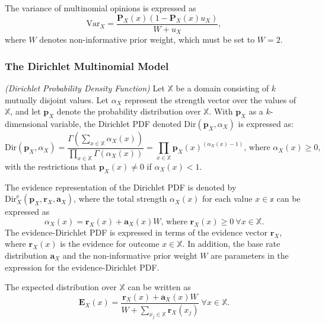 The variance of multinomial opinions is expressed as
\begin{equation}
	\mathrm{Var}_X = \dfrac{\mathbf{P}_X(x)(1 - \mathbf{P}_X(x)u_X)}{W + u_X},
\end{equation}
where $W$ denotes non-informative prior weight, which must be set to $W = 2$.

\subsubsection{The Dirichlet Multinomial Model}

\begin{definition}
	\emph{(Dirichlet Probability Density Function)} Let $\mathbb{X}$ be a domain consisting of $k$ mutually disjoint values. Let $\alpha_X$ represent the strength vector over the
values of $\mathbb{X}$, and let $\mathbf{p}_X$ denote the probability distribution over $\mathbb{X}$. With $\mathbf{p}_X$ as a
$k$-dimensional variable, the Dirichlet PDF denoted $\mathrm{Dir}(\mathbf{p}_X, \alpha_{X})$ is expressed as:
	\begin{equation}
		\mathrm{Dir}(\mathbf{p}_X, \alpha_X) = \dfrac{\Gamma\left(\sum\limits_{x \in \mathbb{X}} \alpha_X(x)\right)}{\prod\limits_{x \in \mathbb{X}} \Gamma(\alpha_X(x))} = \prod\limits_{x \in \mathbb{X}} \mathbf{p}_X(x)^{(\alpha_X(x)-1)} \text{, where } \alpha_X(x) \geq 0\text{,}
	\end{equation}
	with the restrictions that $\mathbf{p}_X(x) \neq 0$ if $\alpha_X(x)	< 1$.
\end{definition}

The evidence representation of the Dirichlet PDF is denoted by $\mathrm{Dir}^{\mathrm{e}}_X(\mathbf{p}_X, \mathbf{r}_X, \mathbf{a}_X)$, where the total strength $\alpha_X(x)$ for each value $x \in \mathbb{x}$ can be expressed as
\begin{equation}
    \alpha_X(x) = \mathbf{r}_X(x) + \mathbf{a}_X(x)W\text{, where }\mathbf{r}_X(x) \geq 0\ \forall x \in \mathbb{X}\text{.}
\end{equation}
The evidence-Dirichlet PDF is expressed in terms of the evidence vector $\mathbf{r}_X$, where $\mathbf{r}_X(x)$ is the evidence for outcome $x \in \mathbb{X}$. In addition, the base rate distribution $\mathbf{a}_X$ and the non-informative prior weight $W$ are parameters in the expression for
the evidence-Dirichlet PDF.

The expected distribution over $\mathbb{X}$ can be written as
\begin{equation}\label{eq:dirithlet_expected_probability}
    \mathbf{E}_X(x) = \dfrac{\mathbf{r}_X(x) + \mathbf{a}_X(x)W}{W + \sum\limits_{x_j \in \mathbb{X}} \mathbf{r}_X(x_j)}\ \forall x \in \mathbb{X}.
\end{equation}

